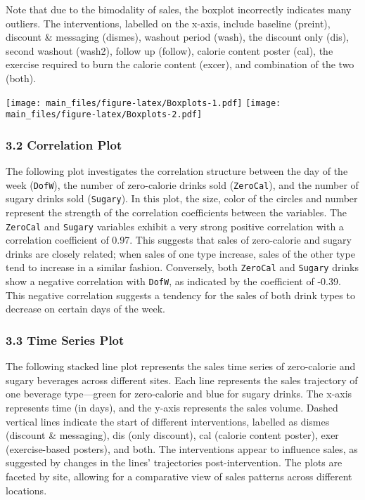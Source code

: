 \documentclass[
]{article}
\begin{document}
Note that due to the bimodality of sales, the boxplot incorrectly
indicates many outliers. The interventions, labelled on the x-axis,
include baseline (preint), discount \& messaging (dismes), washout
period (wash), the discount only (dis), second washout (wash2), follow
up (follow), calorie content poster (cal), the exercise required to burn
the calorie content (excer), and combination of the two (both).

\texttt{[image: main\_files/figure-latex/Boxplots-1.pdf]}
\texttt{[image: main\_files/figure-latex/Boxplots-2.pdf]}

\hypertarget{correlation-plot}{%
\subsubsection{3.2 Correlation Plot}\label{correlation-plot}}

The following plot investigates the correlation structure between the
day of the week (\texttt{DofW}), the number of zero-calorie drinks sold
(\texttt{ZeroCal}), and the number of sugary drinks sold
(\texttt{Sugary}). In this plot, the size, color of the circles and
number represent the strength of the correlation coefficients between
the variables. The \texttt{ZeroCal} and \texttt{Sugary} variables
exhibit a very strong positive correlation with a correlation
coefficient of 0.97. This suggests that sales of zero-calorie and sugary
drinks are closely related; when sales of one type increase, sales of
the other type tend to increase in a similar fashion. Conversely, both
\texttt{ZeroCal} and \texttt{Sugary} drinks show a negative correlation
with \texttt{DofW}, as indicated by the coefficient of -0.39. This
negative correlation suggests a tendency for the sales of both drink
types to decrease on certain days of the week.

\hypertarget{time-series-plot}{%
\subsubsection{3.3 Time Series Plot}\label{time-series-plot}}

The following stacked line plot represents the sales time series of
zero-calorie and sugary beverages across different sites. Each line
represents the sales trajectory of one beverage type---green for
zero-calorie and blue for sugary drinks. The x-axis represents time (in
days), and the y-axis represents the sales volume. Dashed vertical lines
indicate the start of different interventions, labelled as dismes
(discount \& messaging), dis (only discount), cal (calorie content
poster), exer (exercise-based posters), and both. The interventions
appear to influence sales, as suggested by changes in the lines'
trajectories post-intervention. The plots are faceted by site, allowing
for a comparative view of sales patterns across different locations.
\end{document}
